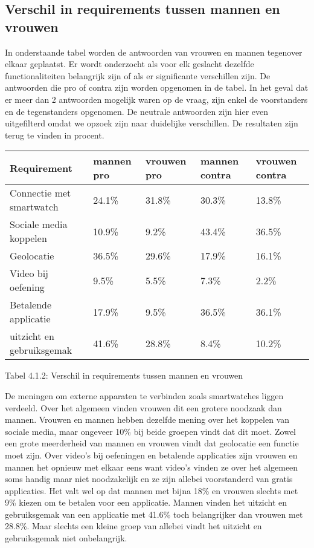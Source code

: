 \subsection{Verschil in requirements tussen mannen en vrouwen}
\label{sec:Resultaten vragenlijst}
In onderstaande tabel worden de antwoorden van vrouwen en mannen tegenover elkaar geplaatst. Er wordt onderzocht als voor elk geslacht dezelfde functionaliteiten belangrijk zijn of als er significante verschillen zijn. De antwoorden die pro of contra zijn worden opgenomen in de tabel. In het geval dat er meer dan 2 antwoorden mogelijk waren op de vraag, zijn enkel de voorstanders en de tegenstanders opgenomen. De neutrale antwoorden zijn hier even uitgefilterd omdat we opzoek zijn naar duidelijke verschillen. De resultaten zijn terug te vinden in procent.
\begin{center}
\begin{tabular}{ |p{2.5cm}|p{2.3cm}|p{2.3cm}||p{2.8cm}|p{2.9cm}| }
 \hline
     \textbf{Requirement} & \textbf{mannen pro} & \textbf{vrouwen pro} & \textbf{mannen contra} & \textbf{vrouwen contra } \\
 \hline
Connectie met smartwatch   & 24.1\%    &31.8\% & 30.3\%    &13.8\%   \\
 \hline
Sociale media koppelen  & 10.9\%    &9.2\% & 43.4\%    & 36.5\%   \\
 \hline
 Geolocatie  & 36.5\%    &29.6\% & 17.9\%    & 16.1\%   \\
 \hline
  Video bij oefening  & 9.5\%    &5.5\% & 7.3\%    & 2.2\%   \\
 \hline
   Betalende applicatie  & 17.9\%    &9.5\% & 36.5\%    &  36.1\%   \\
 \hline
   uitzicht en gebruiksgemak  & 41.6\%    &28.8\% & 8.4\%    &  10.2\%   \\
 \hline
\end{tabular}
  \caption{Tabel 4.1.2: Verschil in requirements tussen mannen en vrouwen}
\end{center}
De meningen om externe apparaten te verbinden zoals smartwatches liggen verdeeld. Over het algemeen vinden vrouwen dit een grotere noodzaak dan mannen. Vrouwen en mannen hebben dezelfde mening over het koppelen van sociale media, maar ongeveer 10\% bij beide groepen vindt dat dit moet. Zowel een grote meerderheid van mannen en vrouwen vindt dat geolocatie een functie moet zijn. Over video’s bij oefeningen en betalende applicaties zijn vrouwen en mannen het opnieuw met elkaar eens want video’s vinden ze over het algemeen soms handig maar niet noodzakelijk en ze zijn allebei voorstanderd van gratis applicaties. Het valt wel op dat mannen met bijna 18\% en vrouwen slechts met 9\% kiezen om te betalen voor een applicatie. Mannen vinden het uitzicht en gebruiksgemak van een applicatie met 41.6\% toch belangrijker dan vrouwen met 28.8\%. Maar slechts een kleine groep van allebei vindt het uitzicht en gebruiksgemak niet onbelangrijk.
